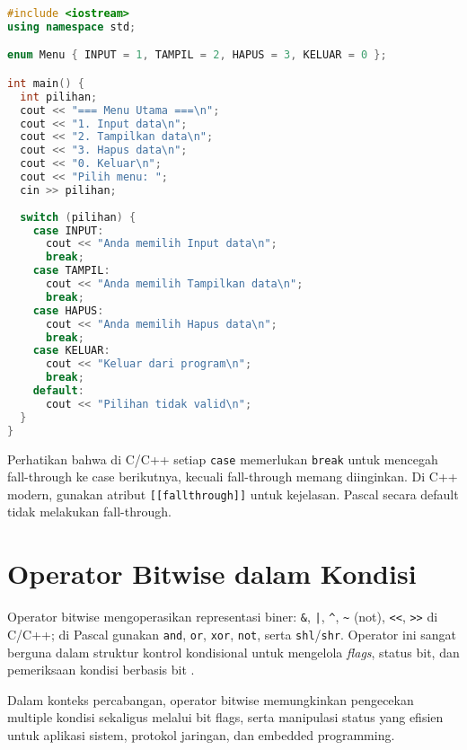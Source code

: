 \documentclass[../main.tex]{subfiles}
\begin{document}
\begin{lstlisting}[language=C++, caption={Menu dengan switch dan enum di C++}]
#include <iostream>
using namespace std;

enum Menu { INPUT = 1, TAMPIL = 2, HAPUS = 3, KELUAR = 0 };

int main() {
  int pilihan;
  cout << "=== Menu Utama ===\n";
  cout << "1. Input data\n";
  cout << "2. Tampilkan data\n";
  cout << "3. Hapus data\n";
  cout << "0. Keluar\n";
  cout << "Pilih menu: ";
  cin >> pilihan;
  
  switch (pilihan) {
    case INPUT:
      cout << "Anda memilih Input data\n";
      break;
    case TAMPIL:
      cout << "Anda memilih Tampilkan data\n";
      break;
    case HAPUS:
      cout << "Anda memilih Hapus data\n";
      break;
    case KELUAR:
      cout << "Keluar dari program\n";
      break;
    default:
      cout << "Pilihan tidak valid\n";
  }
}
\end{lstlisting}

Perhatikan bahwa di C/C++ setiap \texttt{case} memerlukan \texttt{break} untuk mencegah fall-through ke case berikutnya, kecuali fall-through memang diinginkan. Di C++ modern, gunakan atribut \texttt{[[fallthrough]]} untuk kejelasan. Pascal secara default tidak melakukan fall-through.

\section{Operator Bitwise dalam Kondisi}
Operator bitwise mengoperasikan representasi biner: \texttt{\&}, \texttt{|}, \texttt{\^{}}, \texttt{\~{}} (not), \texttt{\textless\textless}, \texttt{\textgreater\textgreater} di C/C++; di Pascal gunakan \texttt{and}, \texttt{or}, \texttt{xor}, \texttt{not}, serta \texttt{shl}/\texttt{shr}. Operator ini sangat berguna dalam struktur kontrol kondisional untuk mengelola \emph{flags}, status bit, dan pemeriksaan kondisi berbasis bit \parencite{free-pascal-docs,iso-c-draft-n1570,cpp-reference}.

Dalam konteks percabangan, operator bitwise memungkinkan pengecekan multiple kondisi sekaligus melalui bit flags, serta manipulasi status yang efisien untuk aplikasi sistem, protokol jaringan, dan embedded programming.
\end{document}
